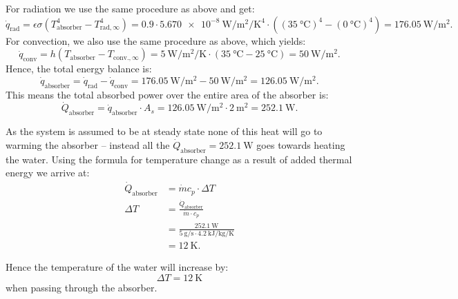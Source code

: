 \begin{derivation}
  For radiation we use the same procedure as above and get:
  \begin{equation*}
    \dot{q}_{\text{rad}} = \epsilon \sigma \left( T_{\text{absorber}}^{4} - T_{\text{rad}, \infty}^{4} \right) = \num{0,9} \cdot \qty{5,670e-8}{\W\per\m\squared\per\K\tothe{4}} \cdot \left( \left( \qty{35}{\celsius}  \right)^{4} - \left( \qty{0}{\celsius}  \right)^{4} \right) = \qty{176,05}{\W\per\m\squared} 
  .\end{equation*}
  For convection, we also use the same procedure as above, which yields:
  \begin{equation*}
    \dot{q}_{\text{conv}} = h \left( T_{\text{absorber}} - T_{\text{conv.}, \infty} \right) = \qty{5}{\W\per\m\squared\per\K} \cdot \left( \qty{35}{\celsius} - \qty{25}{\celsius}  \right) = \qty{50}{\W\per\m\squared} 
  .\end{equation*}
  Hence, the total energy balance is:
  \begin{equation*}
    \dot{q}_{\text{absorber}} = \dot{q}_{\text{rad}} - \dot{q}_{\text{conv}} = \qty{176,05}{\W\per\m\squared}  - \qty{50}{\W\per\m\squared}  = \qty{126,05}{\W\per\m\squared} 
  .\end{equation*}
  This means the total absorbed power over the entire area of the absorber is:
  \begin{equation*}
    \dot{Q}_{\text{absorber}} = \dot{q}_{\text{absorber}} \cdot A_s = \qty{126,05}{\W\per\m\squared} \cdot \qty{2}{\m\squared}  = \qty{252.1}{\W}
  .\end{equation*}
  
  As the system is assumed to be at steady state none of this heat will go to warming the absorber -- instead all the $\dot{Q}_{\text{absorber}} = \qty{252,1}{\W}$ goes towards heating the water.
  Using the formula for temperature change as a result of added thermal energy we arrive at:
  \begin{align*}
    \dot{Q}_{\text{absorber}} &= \dot{m} c_p \cdot \Delta T \\
    \Delta T &= \frac{\dot{Q}_{\text{absorber}}}{\dot{m} \cdot c_p} \\
    &= \frac{\qty{252,1}{\W}}{\qty{5}{\g\per\s} \cdot \qty{4,2}{\kJ\per\kg\per\K}} \\
    &= \qty{12}{\K}
  .\end{align*}
\end{derivation}

\begin{finalresult}
  Hence the temperature of the water will increase by:
  \begin{equation*}
    \Delta T = \qty{12}{\K}
  \end{equation*}
  when passing through the absorber.
\end{finalresult}
